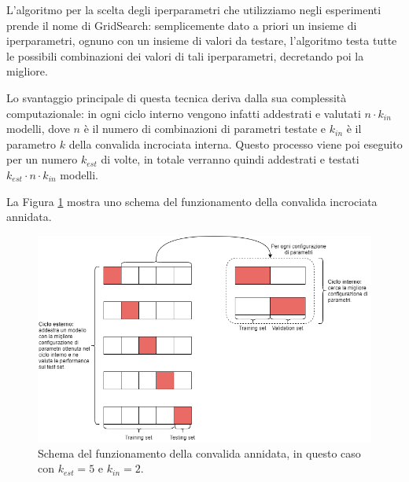 \documentclass[../../main.tex]{subfiles}
\begin{document}
    L'algoritmo per la scelta degli iperparametri che utilizziamo negli esperimenti prende il nome di GridSearch: semplicemente dato a priori un insieme di iperparametri, ognuno con un insieme di valori da testare, l'algoritmo testa tutte le possibili combinazioni dei valori di tali iperparametri, decretando poi la migliore.

    Lo svantaggio principale di questa tecnica deriva dalla sua complessità computazionale: in ogni ciclo interno vengono infatti addestrati e valutati $n \cdot k_{in}$ modelli, dove $n$ è il numero di combinazioni di parametri testate e $k_{in}$ è il parametro $k$ della convalida incrociata interna. Questo processo viene poi eseguito per un numero $k_{est}$ di volte, in totale verranno quindi addestrati e testati $k_{est} \cdot n \cdot k_{in}$ modelli.

    La Figura \ref{fig:nestedCV} mostra uno schema del funzionamento della convalida incrociata annidata.

    \begin{figure}[H]
        \centering
        \includegraphics[width=\textwidth]{immagini/6_3/nestedCV.drawio.png}
        \caption{Schema del funzionamento della convalida annidata, in questo caso con $k_{est} = 5$ e $k_{in} = 2$.}
        \label{fig:nestedCV}
    \end{figure}
\end{document}
